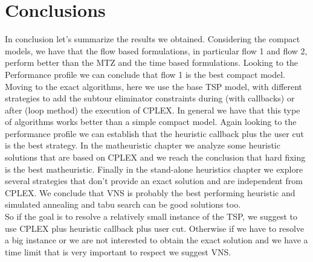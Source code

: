 \chapter{Conclusions}
In conclusion let's summarize the results we obtained. Considering the compact models, we have that the flow based formulations, in particular flow 1 and flow 2, perform better than the MTZ and the time based formulations. Looking to the Performance profile we can conclude that flow 1 is the best compact model.
Moving to the exact algorithms, here we use the base TSP model, with different strategies to add the subtour eliminator constraints during (with callbacks) or after (loop method) the execution of CPLEX. In general we have that this type of algorithms works better than a simple compact model. Again looking to the performance profile we can establish that the heuristic callback plus the user cut is the best strategy.
In the matheuristic chapter we analyze some heuristic solutions that are based on CPLEX and we reach the conclusion that hard fixing is the best matheuristic.
Finally in the stand-alone heuristics chapter we explore several strategies that don't provide an exact solution and are independent from CPLEX. We conclude that VNS is probably the best performing heuristic and simulated annealing and tabu search can be good solutions too. \\

\noindent So if the goal is to resolve a relatively small instance of the TSP, we suggest to use CPLEX plus heuristic callback plus user cut. Otherwise if we have to resolve a big instance or we are not interested to obtain the exact solution and we have a time limit that is very important to respect we suggest VNS. 





